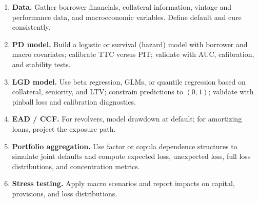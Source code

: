 \documentclass[11pt,letterpaper,openany]{book}
\begin{document}
\begin{enumerate}
\item \textbf{Data.} Gather borrower financials, collateral information, vintage and performance data, and macroeconomic variables. Define default and cure consistently.

\item \textbf{PD model.} Build a logistic or survival (hazard) model with borrower and macro covariates; calibrate TTC versus PIT; validate with AUC, calibration, and stability tests.

\item \textbf{LGD model.} Use beta regression, GLMs, or quantile regression based on collateral, seniority, and LTV; constrain predictions to \((0,1)\); validate with pinball loss and calibration diagnostics.

\item \textbf{EAD / CCF.} For revolvers, model drawdown at default; for amortizing loans, project the exposure path.

\item \textbf{Portfolio aggregation.} Use factor or copula dependence structures to simulate joint defaults and compute expected loss, unexpected loss, full loss distributions, and concentration metrics.

\item \textbf{Stress testing.} Apply macro scenarios and report impacts on capital, provisions, and loss distributions.
\end{enumerate}
\end{document}
